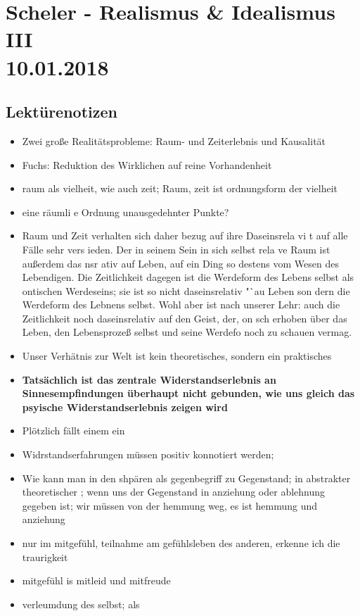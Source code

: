 \documentclass[emulatestandardclasses]{scrartcl}
\begin{document}
\section{Scheler - Realismus \& Idealismus III\\10.01.2018}

\subsection{Lektürenotizen}

\begin{itemize}
  \item Zwei große Realitätsprobleme: Raum- und Zeiterlebnis und Kausalität
  \item Fuchs: Reduktion des Wirklichen auf reine Vorhandenheit 
  \item raum als vielheit, wie auch zeit; Raum, zeit ist ordnungsform der vielheit
  \item eine räumli e Ordnung unausgedehnter Punkte?
  \item Raum und Zeit verhalten sich daher   bezug auf ihre Daseinsrela vi t auf alle Fälle sehr vers ieden. Der in seinem Sein in sich selbst rela ve Raum ist außerdem das nsr ativ auf Leben, auf ein Ding  so  destens vom Wesen des Lebendigen. Die Zeitlichkeit dagegen ist die Werdeform des Lebens
selbst als ontischen Werdeseins; sie ist so nicht daseinsrelativ "`au  Leben son­ dern die Werdeform des Lebnens selbst. Wohl aber ist nach unserer Lehr: auch die Zeitlichkeit noch daseinsrelativ auf den Geist, der, on sch erhoben über das Leben, den Lebensprozeß selbst und seine Werdefo noch zu schauen vermag.
  \item Unser Verhätnis zur Welt ist kein theoretisches, sondern ein praktisches
  \item \textbf{Tatsächlich ist das zentrale Widerstandserlebnis an Sinnesempfindungen überhaupt nicht gebun­den, wie uns gleich das psyische Widerstandserlebnis zeigen wird}
  \item Plötzlich fällt einem ein
  \item Widrstandserfahrungen müssen positiv konnotiert werden; 
  \item Wie kann man in den shpären als gegenbegriff zu Gegenstand; in abstrakter theoretischer ; wenn uns der Gegenstand in anziehung oder ablehnung gegeben ist; wir müssen von der hemmung weg, es ist hemmung und anziehung
  \item nur im mitgefühl, teilnahme am gefühlsleben des anderen, erkenne ich die traurigkeit
  \item mitgefühl is mitleid und mitfreude
  \item verleumdung des selbst; als 

\end{itemize}
\end{document}
